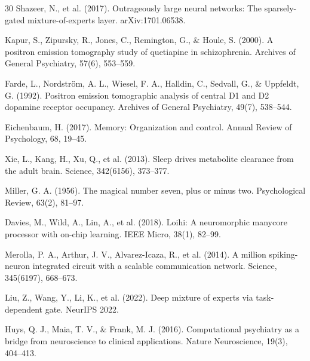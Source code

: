 \documentclass[preprint,12pt]{elsarticle}
\begin{document}
\begin{thebibliography}{30}
Shazeer, N., et al. (2017). Outrageously large neural networks: The sparsely-gated mixture-of-experts layer. arXiv:1701.06538.

Kapur, S., Zipursky, R., Jones, C., Remington, G., \& Houle, S. (2000). A positron emission tomography study of quetiapine in schizophrenia. Archives of General Psychiatry, 57(6), 553--559.

Farde, L., Nordstr\"om, A. L., Wiesel, F. A., Halldin, C., Sedvall, G., \& Uppfeldt, G. (1992). Positron emission tomographic analysis of central D1 and D2 dopamine receptor occupancy. Archives of General Psychiatry, 49(7), 538--544.

Eichenbaum, H. (2017). Memory: Organization and control. Annual Review of Psychology, 68, 19--45.

Xie, L., Kang, H., Xu, Q., et al. (2013). Sleep drives metabolite clearance from the adult brain. Science, 342(6156), 373--377.

Miller, G. A. (1956). The magical number seven, plus or minus two. Psychological Review, 63(2), 81--97.

Davies, M., Wild, A., Lin, A., et al. (2018). Loihi: A neuromorphic manycore processor with on-chip learning. IEEE Micro, 38(1), 82--99.

Merolla, P. A., Arthur, J. V., Alvarez-Icaza, R., et al. (2014). A million spiking-neuron integrated circuit with a scalable communication network. Science, 345(6197), 668--673.

Liu, Z., Wang, Y., Li, K., et al. (2022). Deep mixture of experts via task-dependent gate. NeurIPS 2022.

Huys, Q. J., Maia, T. V., \& Frank, M. J. (2016). Computational psychiatry as a bridge from neuroscience to clinical applications. Nature Neuroscience, 19(3), 404--413.

\end{thebibliography}
\end{document}
